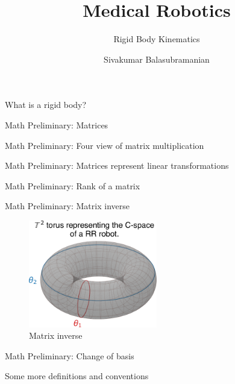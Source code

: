 \documentclass[aspectratio=169]{beamer}
\title{Medical Robotics}
\subtitle{Rigid Body Kinematics}
\author{Sivakumar Balasubramanian}
\institute[Christian Medical College] %
{
  \inst{}%
  Department of Bioengineering\\
  Christian Medical College Vellore
}
\date{}
\begin{document}
\begin{frame}
  \titlepage
\end{frame}


\begin{frame}{What is a rigid body?}
\end{frame}


\begin{frame}{Math Preliminary: Matrices}
\end{frame}


\begin{frame}{Math Preliminary: Four view of matrix multiplication}
\end{frame}


\begin{frame}{Math Preliminary: Matrices represent linear transformations}
\end{frame}


\begin{frame}{Math Preliminary: Rank of a matrix}
\end{frame}


\begin{frame}{Math Preliminary: Matrix inverse}
  \begin{figure}
    \centering
    \includegraphics[width=0.5\textwidth]{../../code/02-rbkin/output/torus2.pdf}
    \caption{Matrix inverse}
    \label{fig:inv}
  \end{figure}
\end{frame}


\begin{frame}{Math Preliminary: Change of basis}
\end{frame}


\begin{frame}{Some more definitions and conventions}
\end{frame}
\end{document}
